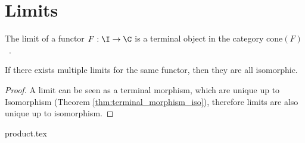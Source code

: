 \section{Limits}

\begin{definition}[Limit]

	The limit of a functor $F:\I\to \C$ is a terminal object in
	the category
	$\mathrm{cone}(F)$~\parencite[p.~118]{leinster:basic_category_theory}.
\end{definition}

\begin{theorem}
	If there exists multiple limits for the same functor, then they are all
	isomorphic.

	\begin{proof}
		A limit can be seen as a terminal morphism, which are unique up to
		Isomorphism (Theorem \ref{thm:terminal_morphism_iso}), therefore limits are
		also unique up to isomorphism.
	\end{proof}
\end{theorem}

{product.tex}



